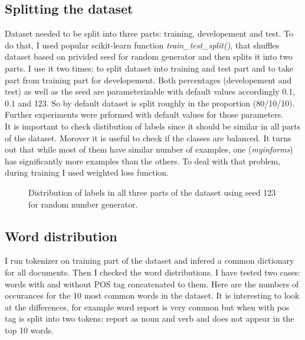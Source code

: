\documentclass{article}
\begin{document}
\subsection{Splitting the dataset}
Dataset needed to be split into three parts: training, developement and test. To do that, I
used popular scikit-learn function \textit{train\_test\_split()}, that shuffles 
dataset based on privided seed for random generator and then splits it into two parts. I use it two times:
to split dataset into training and test part and to take part from training part for developement. Both percentages 
(developement and test) as well as the seed are parameterizable with default values accordingly 0.1, 0.1 and 123.
So by default dataset is split roughly in the proportion (80/10/10). Further experiments were prformed
with default values for those parameters.\\


It is important to check distibution of labels since it should be similar in all parts of the dataset. Morover it
is useful to check if the classes are balanced. It turns out that while most of them have similar number of examples,
one (\textit{myinforms}) has significantly more examples than the others. To deal with that problem, during training I used weighted loss function.

\begin{figure}[h]
	\centering
	\scalebox{0.3}{}
	\caption{Distribution of labels in all three parts of the dataset using seed 123 for random number generator.}
\end{figure}

\newpage

\subsection{Word distribution}
I run tokenizer on training part of the dataset and infered a common dictionary for all documents.
Then I checked the word distributions. I have tested two cases: words
with and without POS tag concatenated to them. Here are the numbers of occurances
for the 10 most common words in the dataset. It is interesting to look at the differences, for example
word report is very common but when with pos tag is split into two tokens: report as noun and verb and does
not appear in the top 10 words. 
\end{document}

